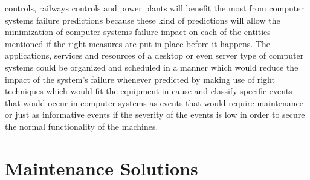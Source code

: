 controls, railways controls and power plants will benefit the most from computer systems failure predictions
because these kind of predictions will allow the minimization of computer systems failure impact on each of
the entities mentioned if the right measures are put in place before it happens. The applications, services
and resources of a desktop or even server type of computer systems could be organized and scheduled in
a manner which would reduce the impact of the system’s failure whenever predicted by making use of right
techniques which would fit the equipment in cause and classify specific events that would occur in computer
systems as events that would require maintenance or just as informative events if the severity of the events
is low in order to secure the normal functionality of the machines.

\section{Maintenance Solutions}

